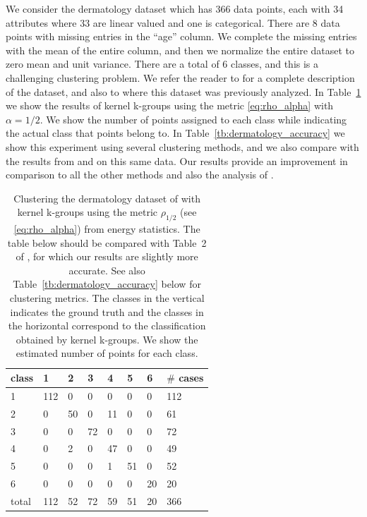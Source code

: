 \documentclass[10pt,journal,compsoc]{IEEEtran}
\begin{document}
We consider the dermatology dataset \cite{Dua2017,Guvenir1998}
which has 366 data points, each with 34 attributes where 33 are
linear valued and one is categorical. There are 8 data points with
missing entries in the ``age'' column. We complete the missing entries
with the mean of the entire column, and then we normalize the entire
dataset to zero mean and unit variance. There are  a total of $6$ classes,
and this is a challenging clustering problem. We refer the reader
to \cite{Dua2017,Guvenir1998} for a complete description of the dataset, 
and also to \cite{RizzoClustering} where this dataset was previously
analyzed. In Table~\ref{tb:dermatology} we show the results of kernel
k-groups using the metric \eqref{eq:rho_alpha} with $\alpha=1/2$.
We show the number of points assigned to each class while indicating
the actual class that points belong to. In Table~\ref{tb:dermatology_accuracy}
we show this experiment using several clustering methods, and we also
compare with the results from \cite{RizzoClustering} and \cite{Kgroups}
on this same data. Our results provide an improvement in comparison
to all the other methods and also the analysis
of \cite{RizzoClustering}.

\begin{table}
\caption{
\label{tb:dermatology}
Clustering the dermatology 
dataset of \cite{Dua2017,Guvenir1998} with kernel k-groups
using the metric $\rho_{1/2}$ (see \eqref{eq:rho_alpha}) from energy
statistics. The table below should be compared with Table~2 of
\cite{RizzoClustering}, for which our results are slightly more accurate.
See also Table~\ref{tb:dermatology_accuracy} below for clustering metrics.
The classes in the vertical indicates the ground truth and the classes
in the horizontal correspond to the classification
obtained by kernel k-groups. We show the estimated number of points
for each class.
}
\centering
\begin{tabular}{@{}l|llllll|l@{}}
class & 1 & 2 & 3 & 4 & 5 & 6 & $\#$ cases \\ \midrule[.5pt]
   1   & 112 & 0  & 0  & 0  & 0  & 0  &  112  \\
   2   &  0  & 50 & 0  & 11 & 0  & 0  &   61  \\
   3   &  0  & 0  & 72 & 0  & 0  & 0  &   72  \\
   4   &  0  & 2  & 0  & 47 & 0  & 0  &   49  \\
   5   &  0  & 0  & 0  & 1  & 51 & 0  &   52  \\
   6   &  0  & 0  & 0  & 0  & 0  & 20 &   20  \\ \midrule[.5pt]
total & 112 & 52 & 72 & 59 & 51 & 20 &  366 %
\end{tabular}
\end{table}
\end{document}
